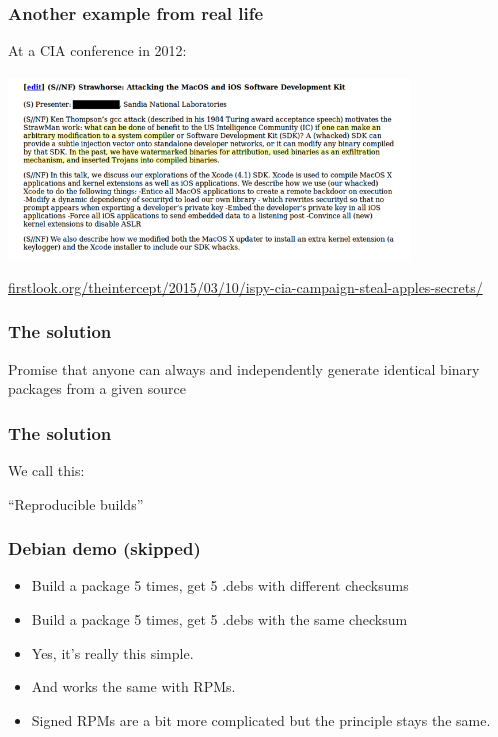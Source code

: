 \documentclass[14pt,aspectratio=169]{beamer}
\newif\ifplacelogo
\begin{document}
\begin{frame}[fragile]
 \frametitle{Another example from real life}

 At a CIA conference in 2012:
 \begin{center}
  \includegraphics[width=0.8\textwidth]{images/strawhorse.png}

  {\footnotesize
  \url{firstlook.org/theintercept/2015/03/10/ispy-cia-campaign-steal-apples-secrets/}
  }
 \end{center}
\end{frame}


\begin{frame}
 \frametitle{The solution}

 \begin{center}
 \Large{
 Promise that anyone can always and independently generate
 identical binary packages from a given source}
\end{center}
\end{frame}


\begin{frame}
 \frametitle{The solution}

 \begin{center}
 We call this:

 \Huge{ “Reproducible builds” }
 \end{center}
\end{frame}

\placelogotrue

\begin{frame}
 \frametitle{Debian demo (skipped)}
 \begin{itemize}
 \item Build a package 5 times, get 5 .debs with different checksums
 \item Build a package 5 times, get 5 .debs with the same checksum\\
 \item<2-4>{Yes, it's really this simple.}
 \item<3-4>{And works the same with RPMs.}
 \item<4>{Signed RPMs are a bit more complicated but the principle stays the
same.}
 \end{itemize}
%
%
\end{frame}
\end{document}
